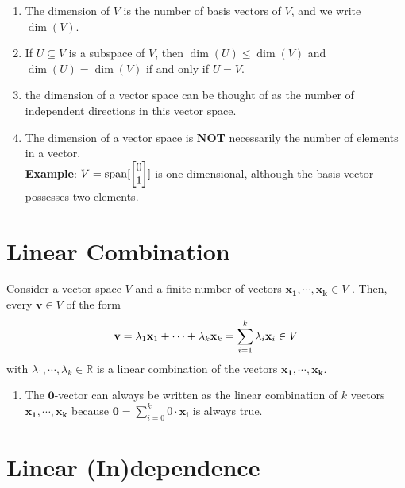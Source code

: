 \begin{enumerate}
    \item The dimension of $V$ is the number of basis vectors of $V$, and we write $\dim(V)$.

    \item If $U \subseteq V$ is a subspace of $V$, then $\dim(U) \leq \dim(V)$ and $\dim(U) = \dim(V)$ if and only if $U = V$.

    \item the dimension of a vector space can be thought of as the number of independent directions in this vector space.

    \item The dimension of a vector space is \textbf{NOT} necessarily the number of elements in a vector.\\
    \textbf{Example}: $V = \operatorname{span}[\begin{bmatrix}0\\1\end{bmatrix}]$ is one-dimensional, although the basis vector possesses two elements.
    
\end{enumerate}









\section{Linear Combination \cite{mfml-1}}\label{Linear Combination}
Consider a vector space $V$ and a finite number of vectors $\mathbf{x_1, \cdots , x_k} \in V$ . Then, every $\mathbf{v} \in V$ of the form
\[
    \hfill
    \displaystyle
    \mathbf{v} = \lambda_1 \mathbf{x}_1 + \cdots + \lambda_k \mathbf{x}_k = \sum_{i=1}^{k} \lambda_i \mathbf{x}_i \in V
    \hfill
\] 
with $\lambda_1, \cdots, \lambda_k \in \mathbb{R}$ is a linear combination of the vectors $\mathbf{x_1, \cdots, x_k}$.

\begin{enumerate}
    \item The $\mathbf{0}$-vector can always be written as the linear combination of $k$ vectors $\mathbf{x_1, \cdots, x_k}$ because $\displaystyle\mathbf{0} = \sum_{i=0}^{k} 0\cdot\mathbf{x_i}$ is always true.
\end{enumerate}






\section{Linear (In)dependence \cite{mfml-1}}\label{Linear (In)dependence}

